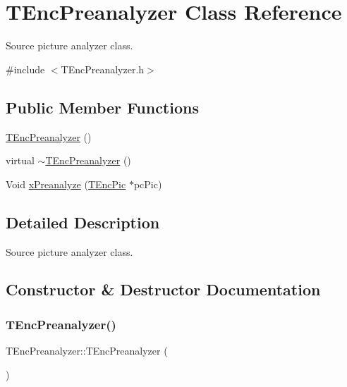 \hypertarget{class_t_enc_preanalyzer}{}\section{T\+Enc\+Preanalyzer Class Reference}
\label{class_t_enc_preanalyzer}


Source picture analyzer class.  




{\ttfamily \#include $<$T\+Enc\+Preanalyzer.\+h$>$}

\subsection*{Public Member Functions}
{\bf }\par
\begin{DoxyCompactItemize}
\item 
\hyperlink{class_t_enc_preanalyzer_a774d0ea551ca9df75da76f91903c4a8f}{T\+Enc\+Preanalyzer} ()
\item 
virtual \hyperlink{class_t_enc_preanalyzer_a90121cb206a2f58a935386276f1484ea}{$\sim$\+T\+Enc\+Preanalyzer} ()
\item 
Void \hyperlink{class_t_enc_preanalyzer_a247b109224d0a34328debc40e06410d9}{x\+Preanalyze} (\hyperlink{class_t_enc_pic}{T\+Enc\+Pic} $\ast$pc\+Pic)
\end{DoxyCompactItemize}



\subsection{Detailed Description}
Source picture analyzer class. 

\subsection{Constructor \& Destructor Documentation}
\mbox{\label{class_t_enc_preanalyzer_a774d0ea551ca9df75da76f91903c4a8f}} 
\subsubsection{\texorpdfstring{T\+Enc\+Preanalyzer()}{TEncPreanalyzer()}}
{\footnotesize\ttfamily T\+Enc\+Preanalyzer\+::\+T\+Enc\+Preanalyzer (\begin{DoxyParamCaption}{ }\end{DoxyParamCaption})}

